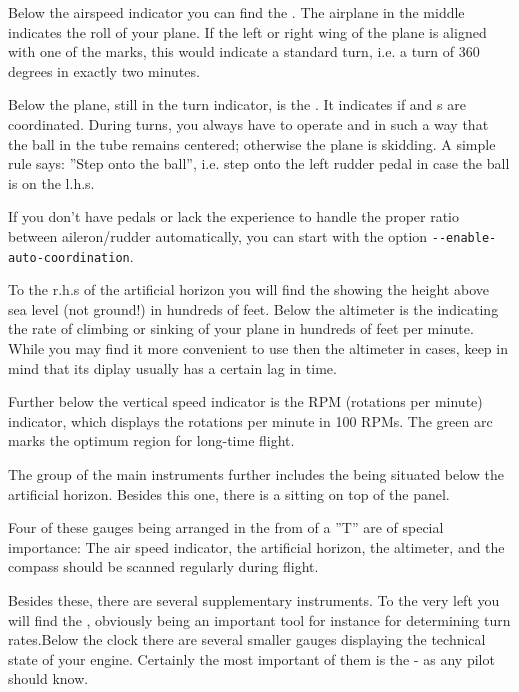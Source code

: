 Below the airspeed indicator you can find the . The airplane in the
middle indicates the roll of your plane. If the left or right wing of the plane is
aligned with one of the marks, this would indicate a standard turn, i.e. a turn of 360
degrees in exactly two minutes.

Below the plane, still in the turn indicator, is the . It indicates
if  and s are coordinated. During turns, you always have to
operate  and  in such a way that the ball in the tube
remains centered; otherwise the plane is skidding. A simple rule says: ''Step onto the ball'', i.e. step onto the left rudder pedal in case the ball is on the l.h.s.

If you don't have pedals or lack the experience to handle the proper ratio between aileron/rudder automatically, you can start
\FlightGear{} with the option \texttt{-$ $-enable-auto-coordination}.

To the r.h.s of the artificial horizon you will find the  showing the height
above sea level (not ground!) in hundreds of feet.  Below the altimeter is the
 indicating the rate of climbing or sinking of your plane
in hundreds of feet per minute. While you may find it more convenient to use then the
altimeter in cases, keep in mind that its diplay usually has a certain lag in time.

Further below the vertical speed indicator is the RPM (rotations per minute)
indicator, which displays the rotations per minute  in 100 RPMs. The
green arc marks the optimum region for long-time flight.

The group of the main instruments further includes the  being
situated below the artificial horizon. Besides this one, there is a  sitting on top of the panel.

Four of these gauges being arranged in the from of a ''T'' are of special importance: The
air speed indicator, the artificial horizon, the altimeter, and the compass should be
scanned regularly during flight.

Besides these, there are several supplementary instruments. To the very left you will find the
, obviously being an important tool for instance for determining turn rates.Below the clock there are several smaller gauges displaying the technical state of your engine. Certainly the most important of them is the  - as any pilot should know.


